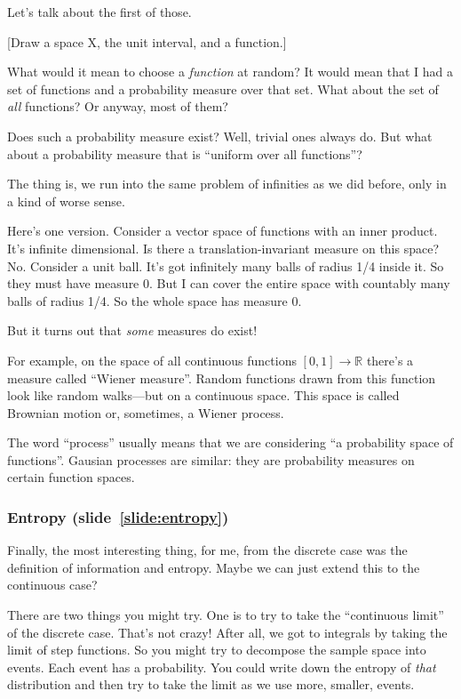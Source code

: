 \documentclass[11pt]{article}
\begin{document}
Let's talk about the first of those.

[Draw a space X, the unit interval, and a function.]

What would it mean to choose a \emph{function} at random? It would mean that I
had a set of functions and a probability measure over that set. What about the
set of \emph{all} functions? Or anyway, most of them?

Does such a probability measure exist? Well, trivial ones always do. But what
about a probability measure that is ``uniform over all functions''?

The thing is, we run into the same problem of infinities as we did before, only
in a kind of worse sense.

Here's one version. Consider a vector space of functions with an inner
product. It's infinite dimensional. Is there a translation-invariant measure on
this space? No. Consider a unit ball. It's got infinitely many balls of radius
1/4 inside it. So they must have measure 0. But I can cover the entire space
with countably many balls of radius 1/4. So the whole space has measure 0. 

But it turns out that \emph{some} measures do exist!

For example, on the space of all continuous functions $[0,1]\to\mathbb{R}$ there's a
measure called ``Wiener measure''. Random functions drawn from this function
look like random walks---but on a continuous space. This space is called Brownian
motion or, sometimes, a Wiener process.

The word ``process'' usually means that we are considering ``a probability space
of functions''. Gausian processes are similar: they are probability measures on
certain function spaces.

\subsubsection*{Entropy (slide~\ref{slide:entropy})}

Finally, the most interesting thing, for me, from the discrete case was the
definition of information and entropy. Maybe we can just extend this to the
continuous case? 

There are two things you might try. One is to try to take the ``continuous
limit'' of the discrete case. That's not crazy! After all, we got to integrals
by taking the limit of step functions. So you might try to decompose the sample
space into events. Each event has a probability. You could write down the
entropy of \emph{that} distribution and then try to take the limit as we use
more, smaller, events. 
\end{document}
